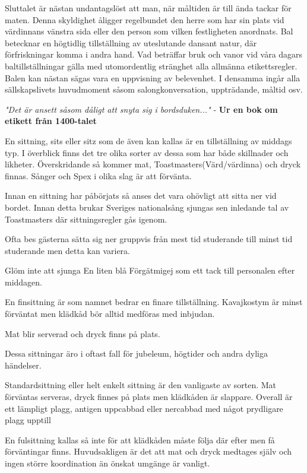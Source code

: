 Sluttalet är nästan undantagslöst att man, när måltiden är till ända tackar för maten. Denna skyldighet åligger regelbundet den herre som har sin plats vid värdinnans vänstra sida eller den person som vilken festligheten anordnats.
\filbreak
{}
Bal betecknar en högtidlig tillställning av uteslutande dansant natur, där förfriskningar komma i andra hand. Vad beträffar bruk och vanor vid våra dagars baltillställningar gälla med utomordentlig stränghet alla allmänna etikettsregler. Balen kan nästan sägas vara en uppvisning av belevenhet. I densamma ingår alla sällskapslivets huvudmoment såsom salongkonversation, uppträdande, måltid osv.

\textit{"Det är ansett såsom dåligt att snyta sig i bordsduken..."} - \textbf{Ur en bok om etikett från 1400-talet}
\filbreak
{}

En sittning, sits eller sitz som de även kan kallas är en tillställning av middags typ. I överblick finns det tre olika sorter av dessa som har både skillnader och likheter. Överskridande så kommer mat, Toastmasters(Värd/värdinna) och dryck finnas. Sånger och Spex i olika slag är att förvänta.

Innan en sittning har påbörjats så anses det vara ohövligt att sitta ner vid bordet. Innan detta brukar Sveriges nationalsång sjungas sen inledande tal av Toastmasters där sittningsregler gås igenom. 

Ofta bes gästerna sätta sig ner gruppvis från mest tid studerande till minst tid studerande men detta kan variera.

Glöm inte att sjunga En liten blå Förgätmigej som ett tack till personalen efter middagen.


En finsittning är som namnet bedrar en finare tillställning. Kavajkostym är minst förväntat men klädkåd bör alltid medföras med inbjudan. 

Mat blir serverad och dryck finns på plats. 

Dessa sittningar äro i oftast fall för jubeleum, högtider och andra dyliga händelser.


Standardsittning eller helt enkelt sittning är den vanligaste av sorten. Mat förväntas serveras, dryck finnes på plats men klädkåden är slappare. Overall är ett lämpligt plagg, antigen uppcabbad eller nercabbad med något prydligare plagg upptill


En fulsittning kallas så inte för att klädkåden måste följa där efter men få förväntingar finns. Huvudsakligen är det att mat och dryck medtages själv och ingen större koordination än önskat umgänge är vanligt.



\newpage